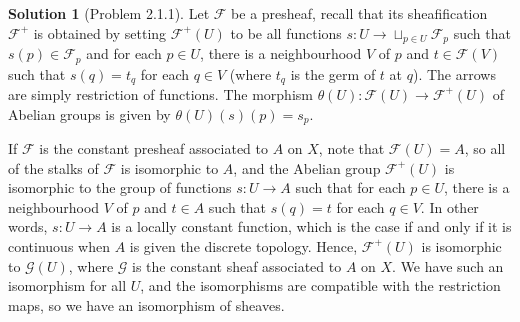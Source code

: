 \documentclass[aps,pra,showpacs,notitlepage,onecolumn,superscriptaddress,nofootinbib]{revtex4-1}
\theoremstyle{definition}
\newtheorem{solution}{Solution}[section]
\begin{document}
\begin{solution}[Problem 2.1.1]
  Let $\mathcal{F}$ be a presheaf, recall that its sheafification $\mathcal{F}^{+}$ is obtained by setting $\mathcal{F}^{+}(U)$ to be all functions $s : U \rightarrow \sqcup_{p \in U} \mathcal{F}_p$
  such that $s(p) \in \mathcal{F}_p$ and for each $p \in U$, there is a neighbourhood $V$ of $p$ and $t \in \mathcal{F}(V)$ such that $s(q) = t_q$ for each $q \in V$ (where $t_q$ is the germ of $t$ at $q$).
  The arrows are simply restriction of functions. The morphism $\theta(U) : \mathcal{F}(U) \rightarrow \mathcal{F}^{+}(U)$ of Abelian groups is given by $\theta(U)(s)(p) = s_p$.

  If $\mathcal{F}$ is the constant presheaf associated to $A$ on $X$, note that $\mathcal{F}(U) = A$, so all of the stalks of $\mathcal{F}$ is isomorphic to $A$, and the Abelian group $\mathcal{F}^{+}(U)$
  is isomorphic to the group of functions $s : U \rightarrow A$ such that for each $p \in U$, there is a neighbourhood $V$ of $p$ and $t \in A$ such that $s(q) = t$ for each $q \in V$. In other words, $s : U \rightarrow A$
  is a locally constant function, which is the case if and only if it is continuous when $A$ is given the discrete topology. Hence, $\mathcal{F}^{+}(U)$ is isomorphic to $\mathcal{G}(U)$, where $\mathcal{G}$ is the
  constant sheaf associated to $A$ on $X$. We have such an isomorphism for all $U$, and the isomorphisms are compatible with the restriction maps, so we have an isomorphism of sheaves.
  \end{solution}
\end{document}
